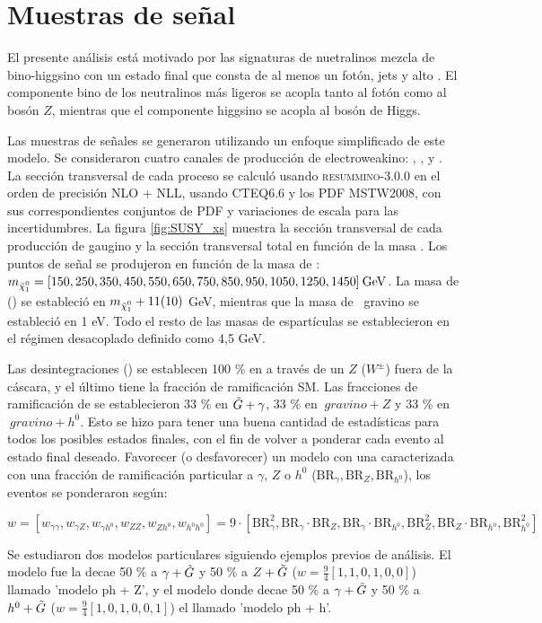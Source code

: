 \section{Muestras de señal}

El presente análisis está motivado por las signaturas de nuetralinos mezcla de bino-higgsino
con un estado final que consta de al menos un
fotón, jets y alto \met. El componente bino de los neutralinos más ligeros se acopla tanto al fotón como al bosón $Z$, mientras que el componente higgsino se acopla al bosón de Higgs.

Las muestras de señales se generaron utilizando un enfoque simplificado de este modelo. Se consideraron cuatro canales de producción de electroweakino: \ninoone \ninotwo, \ninoone \chinoonepm, \ninotwo \chinoonepm y \chinoonep \chinoonem. La sección transversal de cada proceso se calculó usando \textsc{resummino-3.0.0} en el orden de precisión NLO + NLL, usando CTEQ6.6 y los PDF MSTW2008, con sus correspondientes conjuntos de PDF y variaciones de escala para las incertidumbres. La figura \ref{fig:SUSY_xs} muestra la sección transversal de cada producción de gaugino y la sección transversal total en función de la masa \ninoone. Los puntos de señal se produjeron en función de la masa de \ninoone: $m_{\ninoone} = [150, 250, 350, 450, 550, 650, 750, 850, 950, 1050, 1250, 1450] \: \gev$. La masa de \ninotwo (\chinoonepm) se estableció en $m_{\ninoone} + 11 (10)$ GeV, mientras que la masa de \ gravino se estableció en 1 eV. Todo el resto de las masas de espartículas se establecieron en el régimen desacoplado definido como 4,5 GeV.

Las desintegraciones \ninotwo (\chinoonepm) se establecen 100 \% en \ninoone a través de un $ Z $ ($ W ^ {\pm} $) fuera de la cáscara, y el último tiene la fracción de ramificación SM. Las fracciones de ramificación de \ninoone se establecieron 33 \% en $ \tilde{G} + \gamma$, 33 \% en $ \ gravino + Z $ y 33 \% en $ \ gravino + h^{0} $. Esto se hizo para tener una buena cantidad de estadísticas para todos los posibles estados finales, con el fin de volver a ponderar cada evento al estado final deseado. Favorecer (o desfavorecer) un modelo con una \ninoone caracterizada con una fracción de ramificación particular a $\gamma$, $ Z $ o $ h^{0} $ ($ \text{BR}_{\gamma}, \text{BR}_{Z}, \text{BR}_{h^{0}} $), los eventos se ponderaron según:


\begin{equation}
	w  = [w_{\gamma\gamma}, w_{\gamma Z}, w_{\gamma h^{0}}, w_{ZZ}, w_{Zh^{0}}, w_{h^{0}h^{0}}] = 9 \cdot [\text{BR}_{\gamma}^{2}, \text{BR}_{\gamma}\cdot\text{BR}_{Z}, \text{BR}_{\gamma}\cdot\text{BR}_{h^{0}}, \text{BR}_{Z}^{2}, \text{BR}_{Z}\cdot\text{BR}_{h^{0}}, \text{BR}_{h^{0}}^{2}]
\end{equation}

Se estudiaron dos modelos particulares siguiendo ejemplos previos de análisis. El modelo fue la \ninoone decae 50 \% a $ \gamma + \tilde{G} $ y 50 \% a $ Z + \tilde{G} $ ($ w = \frac{9}{4} [1, 1, 0, 1, 0, 0] $) llamado 'modelo ph + Z', y el modelo donde \ninoone decae 50 \% a $ \gamma + \tilde{G} $ y 50 \% a $ h^{0} + \tilde{G} $ ($ w = \frac{9}{4} [1, 0, 1, 0, 0, 1] $) el llamado 'modelo ph + h'. 
